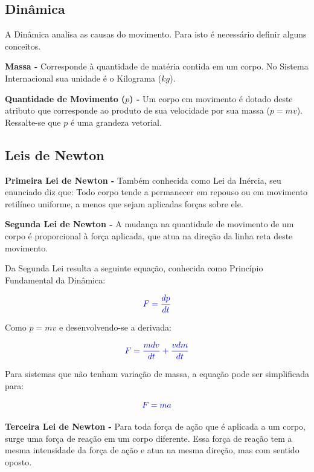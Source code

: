 \documentclass[
    12pt, %
    openright,
    twoside, %
    a4paper, %
    article,
    english,brazil %
]{abntex2}
\begin{document}
\subsection{Dinâmica}

A Dinâmica analisa as causas do movimento. Para isto é necessário definir alguns conceitos.

\textbf{Massa - } Corresponde à quantidade de matéria contida em um corpo. No Sistema Internacional sua unidade é o Kilograma ($kg$).

\textbf{Quantidade de Movimento ($p$) - } Um corpo em movimento é dotado deste atributo que corresponde ao produto de sua velocidade por sua massa ($p = mv$). Ressalte-se que $p$ é uma grandeza vetorial.

\subsection{Leis de Newton}

\textbf{Primeira Lei de Newton - } Também conhecida como Lei da Inércia, seu enunciado diz que: Todo corpo tende a permanecer em repouso ou em movimento retilíneo uniforme, a menos que sejam aplicadas forças sobre ele.

\textbf{Segunda Lei de Newton - } A mudança na quantidade de movimento de um corpo é proporcional à força aplicada, que atua na direção da linha reta deste movimento.

Da Segunda Lei resulta a seguinte equação, conhecida como Princípio Fundamental da Dinâmica:

\begin{equation}
    \color{blue}
    F = \frac{dp}{dt}
\end{equation}

Como $p = mv$ e desenvolvendo-se a derivada:

\begin{equation}
    \color{blue}
    F = \frac{mdv}{dt} + \frac{vdm}{dt}
\end{equation}

Para sistemas que não tenham variação de massa, a equação pode ser simplificada para:

\begin{equation}
    \color{blue}
    F = ma
\end{equation}

\textbf{Terceira Lei de Newton - } Para toda força de ação que é aplicada a um corpo, surge uma força de reação em um corpo diferente. Essa força de reação tem a mesma intensidade da força de ação e atua na mesma direção, mas com sentido oposto.
\end{document}
